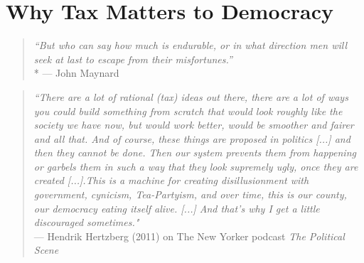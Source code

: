 
\section{Why Tax Matters to Democracy}

\begin{quote}
	\emph{``But who can say how much is endurable, or in what direction men will seek at last to escape from their misfortunes.''}\\*
	--- John Maynard \cite{Keynes1936}
\end{quote}


\begin{quote}
	\emph{``There are a lot of rational (tax) ideas out there, there are a lot of ways you could build something from scratch that would look roughly like the society we have now, but would work better, would be smoother and fairer and all that. And of course, these things are proposed in politics [...] and then they cannot be done. Then our system prevents them from happening or garbels them in such a way that they look supremely ugly, once they are created [...].This is a machine for creating disillusionment with government, cynicism, Tea-Partyism, and over time, this is our county, our democracy eating itself alive. [...] And that's why I get a little discouraged sometimes."}\\
	--- Hendrik Hertzberg (2011) on The New Yorker podcast \emph{The Political Scene}
\end{quote}


